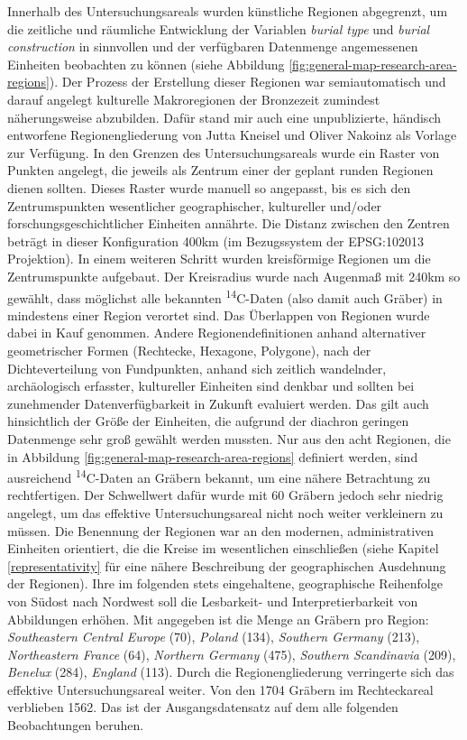 \documentclass[openany,twoside,twocolumn]{book}
\begin{document}
Innerhalb des Untersuchungsareals wurden künstliche Regionen abgegrenzt,
um die zeitliche und räumliche Entwicklung der Variablen \emph{burial
type} und \emph{burial construction} in sinnvollen und der verfügbaren
Datenmenge angemessenen Einheiten beobachten zu können (siehe Abbildung
\ref{fig:general-map-research-area-regions}). Der Prozess der Erstellung
dieser Regionen war semiautomatisch und darauf angelegt kulturelle
Makroregionen der Bronzezeit zumindest näherungsweise abzubilden. Dafür
stand mir auch eine unpublizierte, händisch entworfene
Regionengliederung von Jutta Kneisel und Oliver Nakoinz als Vorlage zur
Verfügung. In den Grenzen des Untersuchungsareals wurde ein Raster von
Punkten angelegt, die jeweils als Zentrum einer der geplant runden
Regionen dienen sollten. Dieses Raster wurde manuell so angepasst, bis
es sich den Zentrumspunkten wesentlicher geographischer, kultureller
und/oder forschungsgeschichtlicher Einheiten annährte. Die Distanz
zwischen den Zentren beträgt in dieser Konfiguration 400km (im
Bezugssystem der EPSG:102013 Projektion). In einem weiteren Schritt
wurden kreisförmige Regionen um die Zentrumspunkte aufgebaut. Der
Kreisradius wurde nach Augenmaß mit 240km so gewählt, dass möglichst
alle bekannten \textsuperscript{14}C-Daten (also damit auch Gräber) in
mindestens einer Region verortet sind. Das Überlappen von Regionen wurde
dabei in Kauf genommen. Andere Regionendefinitionen anhand alternativer
geometrischer Formen (Rechtecke, Hexagone, Polygone), nach der
Dichteverteilung von Fundpunkten, anhand sich zeitlich wandelnder,
archäologisch erfasster, kultureller Einheiten sind denkbar und sollten
bei zunehmender Datenverfügbarkeit in Zukunft evaluiert werden. Das gilt
auch hinsichtlich der Größe der Einheiten, die aufgrund der diachron
geringen Datenmenge sehr groß gewählt werden mussten. Nur aus den acht
Regionen, die in Abbildung \ref{fig:general-map-research-area-regions}
definiert werden, sind ausreichend \textsuperscript{14}C-Daten an
Gräbern bekannt, um eine nähere Betrachtung zu rechtfertigen. Der
Schwellwert dafür wurde mit 60 Gräbern jedoch sehr niedrig angelegt, um
das effektive Untersuchungsareal nicht noch weiter verkleinern zu
müssen. Die Benennung der Regionen war an den modernen, administrativen
Einheiten orientiert, die die Kreise im wesentlichen einschließen (siehe
Kapitel \ref{representativity} für eine nähere Beschreibung der
geographischen Ausdehnung der Regionen). Ihre im folgenden stets
eingehaltene, geographische Reihenfolge von Südost nach Nordwest soll
die Lesbarkeit- und Interpretierbarkeit von Abbildungen erhöhen. Mit
angegeben ist die Menge an Gräbern pro Region: \emph{Southeastern
Central Europe} (70), \emph{Poland} (134), \emph{Southern Germany}
(213), \emph{Northeastern France} (64), \emph{Northern Germany} (475),
\emph{Southern Scandinavia} (209), \emph{Benelux} (284), \emph{England}
(113). Durch die Regionengliederung verringerte sich das effektive
Untersuchungsareal weiter. Von den 1704 Gräbern im Rechteckareal
verblieben 1562. Das ist der Ausgangsdatensatz auf dem alle folgenden
Beobachtungen beruhen.
\end{document}
